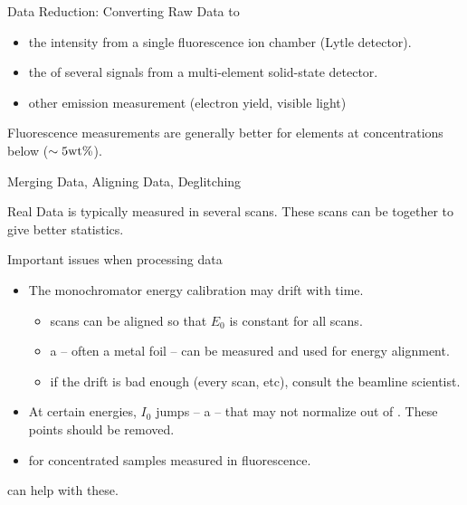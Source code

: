 \begin{slide}{Data Reduction: Converting Raw Data to  {\mue}  }
\begin{cenpage}{145mm}
{{ \begin{itemize}
 \item  the intensity from a single fluorescence ion chamber (Lytle detector).
 \item  the {} of several signals from a multi-element solid-state detector.
 \item  other emission measurement (electron yield, visible light)
 \end{itemize}

 \vmm
  
 
 Fluorescence measurements are generally better for
 elements at concentrations below  ($\sim 5 {\rm wt  \%}$).

}}

  \vfill
  
\end{cenpage}
\end{slide}

\begin{slide}{Merging Data, Aligning Data, Deglitching }

Real Data is typically measured in several scans.  These scans can be
{} together to give better statistics.

\vmm
Important issues when processing data

\begin{cenpage}{120mm}
\begin{itemize}
\item The monochromator energy calibration may drift with time.
  \begin{itemize}
    \item scans can be aligned so that $E_0$ is constant for all scans.
    \item a {} -- often a metal foil -- can be
      measured {} and used for energy alignment.
    \item if the drift is bad enough (every scan, etc), consult the
      beamline scientist.
  \end{itemize}
\item At certain energies, $I_0$ jumps -- a {} -- that may
  not normalize out of {\mue}.  These points should be removed.
\item {} for concentrated samples measured in
  fluorescence.
  \end{itemize}
\end{cenpage}

{\xasviewer}  can help with these.

\end{slide}

